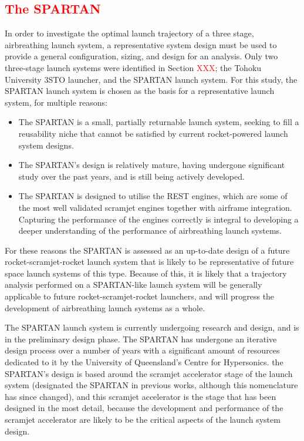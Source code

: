 \textcolor{red}{
\section{The SPARTAN}
}


In order to investigate the optimal launch trajectory of a three stage, airbreathing launch system, a representative system design must be used to provide a general configuration, sizing, and design for an analysis. Only two three-stage launch systems were identified in Section \textcolor{red}{XXX}; the Tohoku University 3STO launcher, and the SPARTAN launch system. For this study, the SPARTAN launch system is chosen as the basis for a representative launch system, for multiple reasons:
\begin{itemize}
	\item The SPARTAN is a small, partially returnable launch system, seeking to fill a reusability niche that cannot be satisfied by current rocket-powered launch system designs.
	\item The SPARTAN's design is relatively mature, having undergone significant study over the past years, and is still being actively developed.
	\item The SPARTAN is designed to utilise the REST engines, which are some of the most well validated scramjet engines together with airframe integration. Capturing the performance of the engines correctly is integral to developing a deeper understanding of the performance of airbreathing launch systems.
\end{itemize}
For these reasons the SPARTAN is assessed as an up-to-date design of a future rocket-scramjet-rocket launch system that is likely to be representative of future space launch systems of this type. Because of this, it is likely that a trajectory analysis performed on a SPARTAN-like launch system will be generally applicable to future rocket-scramjet-rocket launchers, and will progress the development of airbreathing launch systems as a whole. 




 

 The SPARTAN launch system is currently undergoing research and design, and is in the preliminary design phase. The SPARTAN has undergone an iterative design process over a number of years\cite{Jazra2013,Preller2017b} with a significant amount of resources dedicated to it by the University of Queensland's Centre for Hypersonics.
 the SPARTAN's design is based around the scramjet accelerator stage of the launch system (designated the SPARTAN in previous works, although this nomenclature has since changed), and this scramjet accelerator is the stage that has been designed in the most detail\cite{Jazra2013,Preller2017b}, because the development and performance of the scramjet accelerator are likely to be the critical aspects of the launch system design. 
 
